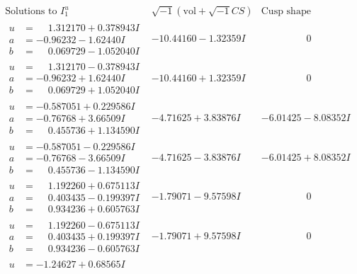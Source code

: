 \documentclass[1p]{elsarticle_modified}
\theoremstyle{definition}
\newcommand{\I}{\sqrt{-1}}
\begin{document}
$$\begin{array}{c|c|c}
\text{Solutions to }I^u_{1}& \I (\text{vol} + \sqrt{-1}CS) & \text{Cusp shape}\\
 \hline 
\begin{aligned}
u &= \phantom{-}1.312170 + 0.378943 I \\
a &= -0.96232 - 1.62440 I \\
b &= \phantom{-}0.069729 - 1.052040 I\end{aligned}
 & -10.44160 - 1.32359 I & \phantom{-0.000000 } 0 \\ \hline\begin{aligned}
u &= \phantom{-}1.312170 - 0.378943 I \\
a &= -0.96232 + 1.62440 I \\
b &= \phantom{-}0.069729 + 1.052040 I\end{aligned}
 & -10.44160 + 1.32359 I & \phantom{-0.000000 } 0 \\ \hline\begin{aligned}
u &= -0.587051 + 0.229586 I \\
a &= -0.76768 + 3.66509 I \\
b &= \phantom{-}0.455736 + 1.134590 I\end{aligned}
 & -4.71625 + 3.83876 I & -6.01425 - 8.08352 I \\ \hline\begin{aligned}
u &= -0.587051 - 0.229586 I \\
a &= -0.76768 - 3.66509 I \\
b &= \phantom{-}0.455736 - 1.134590 I\end{aligned}
 & -4.71625 - 3.83876 I & -6.01425 + 8.08352 I \\ \hline\begin{aligned}
u &= \phantom{-}1.192260 + 0.675113 I \\
a &= \phantom{-}0.403435 - 0.199397 I \\
b &= \phantom{-}0.934236 + 0.605763 I\end{aligned}
 & -1.79071 - 9.57598 I & \phantom{-0.000000 } 0 \\ \hline\begin{aligned}
u &= \phantom{-}1.192260 - 0.675113 I \\
a &= \phantom{-}0.403435 + 0.199397 I \\
b &= \phantom{-}0.934236 - 0.605763 I\end{aligned}
 & -1.79071 + 9.57598 I & \phantom{-0.000000 } 0 \\ \hline\begin{aligned}
u &= -1.24627 + 0.68565 I \\

\end{aligned}
\end{array}$$
\end{document}

